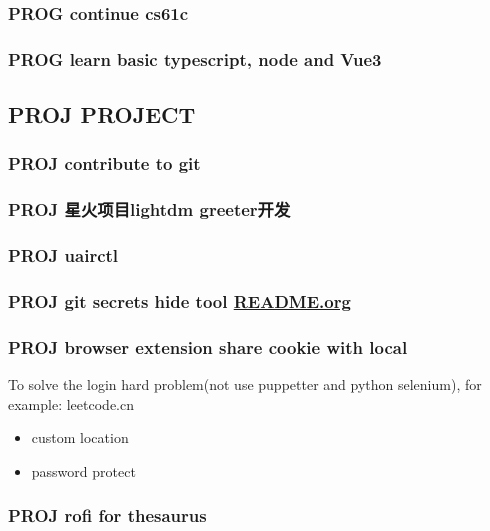\documentclass[11pt]{article}
\begin{document}
\subsubsection{{\bfseries\sffamily PROG} continue cs61c}
\label{sec:orge8917e1}
\subsubsection{{\bfseries\sffamily PROG} learn basic typescript, node and Vue3}
\label{sec:org30063c6}


\subsection{{\bfseries\sffamily PROJ} PROJECT}
\label{sec:org543deb6}
\subsubsection{{\bfseries\sffamily PROJ} contribute to git}
\label{sec:org942b7af}
\subsubsection{{\bfseries\sffamily PROJ} 星火项目lightdm greeter开发}
\label{sec:orgdf74cfe}
\subsubsection{{\bfseries\sffamily PROJ} uairctl}
\label{sec:org75885fb}
\subsubsection{{\bfseries\sffamily PROJ} git secrets hide tool \href{file:///home/zarkli/projects/git\_secret\_havent\_named\_yet/README.org}{README.org}}
\label{sec:orgf239359}
\subsubsection{{\bfseries\sffamily PROJ} browser extension share cookie with local}
\label{sec:org1627701}
To solve the login hard problem(not use puppetter and python selenium), for example: leetcode.cn
\begin{itemize}
\item custom location
\item password protect
\end{itemize}

\subsubsection{{\bfseries\sffamily PROJ} rofi for thesaurus}
\label{sec:org837b709}
\end{document}
